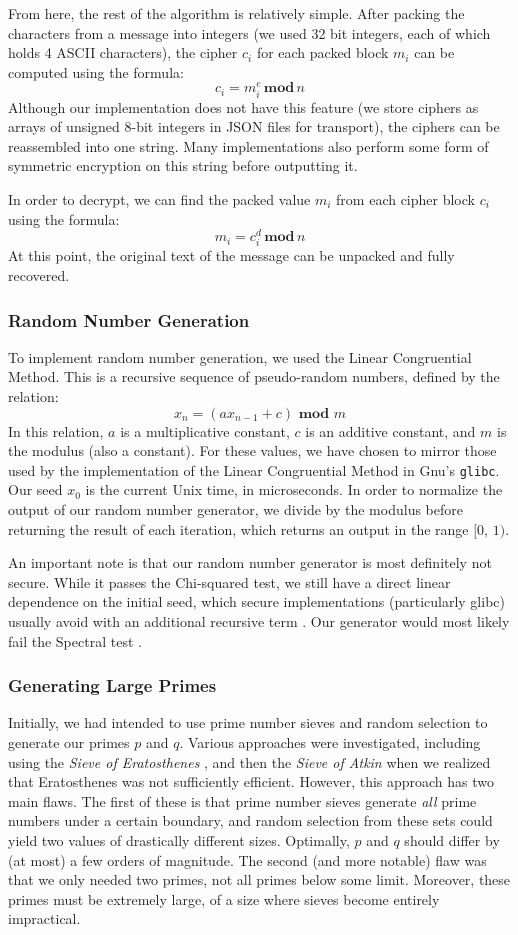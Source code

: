 \documentclass{article}
\newcommand{\code}[1]{\colorbox{light-gray}{\texttt{#1}}}
\begin{document}
From here, the rest of the algorithm is relatively simple. After packing the characters from a message into integers (we used 32 bit integers, each of which holds 4 ASCII characters), the cipher $c_i$ for each packed block $m_i$ can be computed using the formula:
\[ c_i = m_i^e\, \textbf{mod} \, n \]
Although our implementation does not have this feature (we store ciphers as arrays of unsigned 8-bit integers in JSON files for transport), the ciphers can be reassembled into one string. Many implementations also perform some form of symmetric encryption on this string before outputting it.

In order to decrypt, we can find the packed value $m_i$ from each cipher block $c_i$ using the formula:
	\[ m_i = c_i^d \,\textbf{mod}\, n \]
At this point, the original text of the message can be unpacked and fully recovered.

\subsubsection{Random Number Generation}
To implement random number generation, we used the Linear Congruential Method. This is a recursive sequence of pseudo-random numbers, defined by the relation:
\[ x_n = (ax_{n - 1} + c) \textbf{ mod } m \]
In this relation, $a$ is a multiplicative constant, $c$ is an additive constant, and $m$ is the modulus (also a constant). For these values, we have chosen to mirror those used by the implementation of the Linear Congruential Method in Gnu's \code{glibc}. Our seed $x_0$ is the current Unix time, in microseconds. In order to normalize the output of our random number generator, we divide by the modulus before returning the result of each iteration, which returns an output in the range $[0,\, 1)$.

An important note is that our random number generator is most definitely not secure. While it passes the Chi-squared test, we still have a direct linear dependence on the initial seed, which secure implementations (particularly glibc) usually avoid with an additional recursive term \cite{lcm}. Our generator would most likely fail the Spectral test \cite{spectral}.

\subsubsection{Generating Large Primes}
Initially, we had intended to use prime number sieves and random selection to generate our primes $p$ and $q$. Various approaches were investigated, including using the \textit{Sieve of Eratosthenes} \cite{sieveeratosthenes}, and then the \textit{Sieve of Atkin} \cite{sieveatkin} when we realized that Eratosthenes was not sufficiently efficient. However, this approach has two main flaws. The first of these is that prime number sieves generate \textit{all} prime numbers under a certain boundary, and random selection from these sets could yield two values of drastically different sizes. Optimally, $p$ and $q$ should differ by (at most) a few orders of magnitude. The second (and more notable) flaw was that we only needed two primes, not all primes below some limit. Moreover, these primes must be extremely large, of a size where sieves become entirely impractical.
\end{document}
